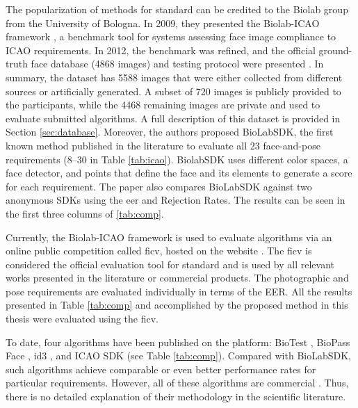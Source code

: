 The popularization of methods for \icao standard can be credited to the Biolab group from the University of Bologna. In 2009, they presented the Biolab-ICAO framework \citep{maltoni2009biolab}, a benchmark tool for systems assessing face image compliance to ICAO requirements. In 2012, the benchmark was refined, and the official ground-truth face database (4868 images) and testing protocol were presented \citep{ferrara2012face}. In summary, the dataset has 5588 images that were either collected from different sources or artificially generated. A subset of 720 images is publicly provided to the participants, while the 4468 remaining images are private and used to evaluate submitted algorithms. A full description of this dataset is provided in Section \ref{sec:database}. Moreover, the authors proposed BioLabSDK, the first known method published in the literature to evaluate all 23 face-and-pose requirements (8--30 in Table \ref{tab:icao}). BiolabSDK uses different color spaces, a face detector, and points that define the face and its elements to generate a score for each requirement. The paper also compares BioLabSDK against two anonymous SDKs using the \acs{eer} and Rejection Rates. The results can be seen in the first three columns of \autoref{tab:comp}.
 

 
Currently, the Biolab-ICAO framework is used to evaluate algorithms via an online public competition called \acf{ficv}, hosted on the \fvcongoing website \citep{fvcongoing}. The \acs{ficv} is considered the official evaluation tool for \icao standard and is used by all relevant works presented in the literature or commercial products. The photographic and pose requirements are evaluated individually in terms of the EER. All the results presented in Table \ref{tab:comp} and accomplished by the proposed method in this thesis were evaluated using the \acs{ficv}.
 
To date, four algorithms have been published on the \fvcongoing platform: BioTest \citep{fvcBioTest}, BioPass Face \citep{fvcVsoft}, id3 \citep{fvcICAOCompliance}, and ICAO SDK \citep{fvcSeamfix} (see Table \ref{tab:comp}). Compared with BioLabSDK, such algorithms achieve comparable or even better performance rates for particular requirements. However, all of these algorithms are commercial \citep{biometrika, id3, seamfix, vsoft}. Thus, there is no detailed explanation of their methodology in the scientific literature.
 
